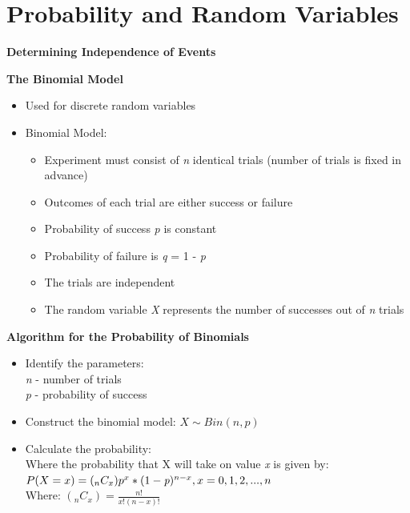 \documentclass{article}
\begin{document}
\section{Probability and Random Variables}

\textbf{Determining Independence of Events}

\textbf{The Binomial Model}
\begin{itemize}
    \item Used for discrete random variables
    \item Binomial Model:
    \begin{itemize}
        \item Experiment must consist of \emph{n} identical trials (number of trials is fixed in advance)
        \item Outcomes of each trial are either success or failure
        \item Probability of success \emph{p} is constant
        \item Probability of failure is \emph{q} = 1 - \emph{p}
        \item The trials are independent
        \item The random variable \emph{X} represents the number of successes out of \emph{n} trials 
    \end{itemize}
\end{itemize}

\noindent
\textbf{Algorithm for the Probability of Binomials}
\begin{itemize}
    \item Identify the parameters: \\
    \emph{n} - number of trials \\
    \emph{p} - probability of success
    \item Construct the binomial model: \begin{math}
        X \sim Bin(n , p)    
    \end{math}
    \item Calculate the probability: \\
    Where the probability that X will take on value \emph{x} is given by:\\
    \begin{math} 
        P(X = x) = (_{n}C_{x})p^x * (1-\emph{p})^{n-x}, x = 0, 1, 2, ..., n     
    \end{math} \\
    Where: \begin{math}
        (_{n}C_{x}) = \frac{n!}{x!(n-x)!}
    \end{math}
\end{itemize}
\end{document}
